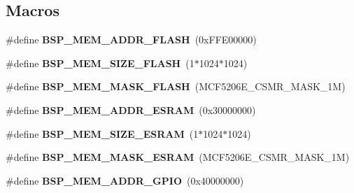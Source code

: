 \subsection*{Macros}
\begin{DoxyCompactItemize}
\item 
\mbox{\label{group__RTEMSBSPsM68kMCF5206Elite_gafd4c71f793210e7a3d5b6fffb629eb9d}} 
\#define {\bfseries B\+S\+P\+\_\+\+M\+E\+M\+\_\+\+A\+D\+D\+R\+\_\+\+F\+L\+A\+SH}~(0x\+F\+F\+E00000)
\item 
\mbox{\label{group__RTEMSBSPsM68kMCF5206Elite_gaaf9e8c1f08026e1c74d2b161cb3969fb}} 
\#define {\bfseries B\+S\+P\+\_\+\+M\+E\+M\+\_\+\+S\+I\+Z\+E\+\_\+\+F\+L\+A\+SH}~(1$\ast$1024$\ast$1024)
\item 
\mbox{\label{group__RTEMSBSPsM68kMCF5206Elite_ga2f780e3fd1ae4d153180c6f83541f758}} 
\#define {\bfseries B\+S\+P\+\_\+\+M\+E\+M\+\_\+\+M\+A\+S\+K\+\_\+\+F\+L\+A\+SH}~(M\+C\+F5206\+E\+\_\+\+C\+S\+M\+R\+\_\+\+M\+A\+S\+K\+\_\+1M)
\item 
\mbox{\label{group__RTEMSBSPsM68kMCF5206Elite_gaca8d0486610fd5d014179e689275cc93}} 
\#define {\bfseries B\+S\+P\+\_\+\+M\+E\+M\+\_\+\+A\+D\+D\+R\+\_\+\+E\+S\+R\+AM}~(0x30000000)
\item 
\mbox{\label{group__RTEMSBSPsM68kMCF5206Elite_gab69df37502f9004a85da491b26bac3b5}} 
\#define {\bfseries B\+S\+P\+\_\+\+M\+E\+M\+\_\+\+S\+I\+Z\+E\+\_\+\+E\+S\+R\+AM}~(1$\ast$1024$\ast$1024)
\item 
\mbox{\label{group__RTEMSBSPsM68kMCF5206Elite_ga6d6c07a568faa230b8edc985dbd6f27f}} 
\#define {\bfseries B\+S\+P\+\_\+\+M\+E\+M\+\_\+\+M\+A\+S\+K\+\_\+\+E\+S\+R\+AM}~(M\+C\+F5206\+E\+\_\+\+C\+S\+M\+R\+\_\+\+M\+A\+S\+K\+\_\+1M)
\item 
\mbox{\label{group__RTEMSBSPsM68kMCF5206Elite_ga740cdd252b2e4ebc4af65b39103103f0}} 
\#define {\bfseries B\+S\+P\+\_\+\+M\+E\+M\+\_\+\+A\+D\+D\+R\+\_\+\+G\+P\+IO}~(0x40000000)
\item 
\mbox{\label{group__RTEMSBSPsM68kMCF5206Elite_ga34eb12dd3864f9ece40da53f4a9b85d7}} 

\end{DoxyCompactItemize}
